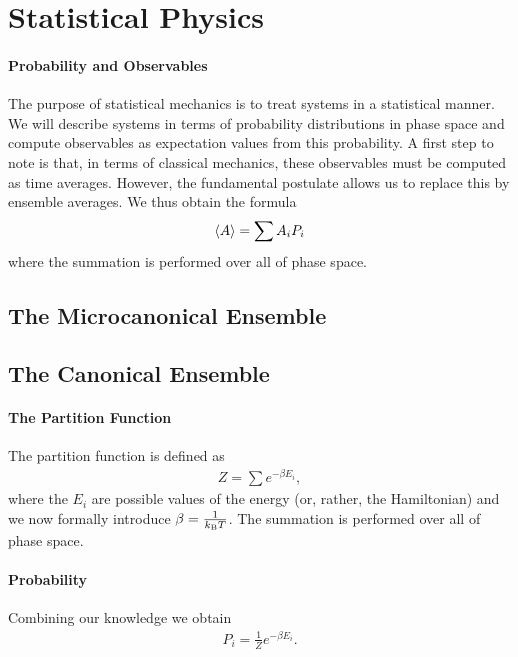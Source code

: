 \section{Statistical Physics}

\paragraph{Probability and Observables}
The purpose of statistical mechanics is to treat systems in a statistical manner. We will describe systems in terms of probability distributions in phase space and compute observables as expectation values from this probability. A first step to note is that, in terms of classical mechanics, these observables must be computed as time averages. However, the fundamental postulate allows us to replace this by ensemble averages. We thus obtain the formula
\begin{align*}
	\expval{A} = \sum A_{i}P_{i}
\end{align*}
where the summation is performed over all of phase space.

\subsection{The Microcanonical Ensemble}

\subsection{The Canonical Ensemble}

\paragraph{The Partition Function}
The partition function is defined as
\begin{align*}
	Z = \sum e^{-\beta E_{i}},
\end{align*}
where the $E_{i}$ are possible values of the energy (or, rather, the Hamiltonian) and we now formally introduce $\beta = \frac{1}{k_{\text{B}} T}$. The summation is performed over all of phase space.

\paragraph{Probability}
Combining our knowledge we obtain
\begin{align*}
	P_{i} = \frac{1}{Z}e^{-\beta E_{i}}.
\end{align*}

